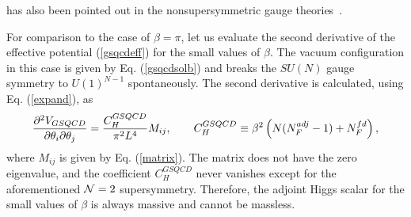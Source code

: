 \documentclass[a4paper,12pt]{article}
\begin{document}
has also been pointed out in the nonsupersymmetric 
gauge theories~\cite{intf}.
\par
For comparison to the case of $\beta=\pi$, let us evaluate the second 
derivative of the effective potential (\ref{gsqcdeff}) for the 
small values of $\beta$. 
The vacuum configuration in this case is given by
Eq. (\ref{gsqcdsolb}) and breaks the $SU(N)$ gauge symmetry
to $U(1)^{N-1}$ spontaneously. The second derivative is calculated, using 
Eq. ({\ref{expand}), as
\begin{equation}
{{\partial^2V_{GSQCD}}\over{\partial\theta_i\partial\theta_j}}
={{C_H^{GSQCD}}\over{\pi^2 L^4}}M_{ij},
\qquad 
C_H^{GSQCD}\equiv \beta^2\left(N(N_F^{adj}-1)+N_F^{fd}\right),
\label{massless}
\end{equation}
where $M_{ij}$ is given by Eq. (\ref{matrix}).
The matrix does not have the zero eigenvalue, and the coefficient
$C_H^{GSQCD}$ never vanishes except for the aforementioned ${\cal N}=2$
supersymmetry. Therefore, the adjoint Higgs scalar 
for the small values of $\beta$ is always massive and cannot be massless.
}
\end{document}

